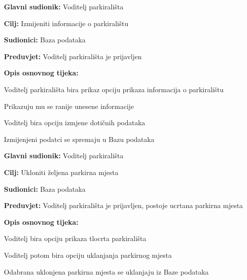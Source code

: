                         \noindent {}
					\begin{packed_item}
	
						\item \textbf{Glavni sudionik: }Voditelj parkirališta
						\item  \textbf{Cilj:} Izmijeniti informacije o parkiralištu
						\item  \textbf{Sudionici:} Baza podataka
						\item  \textbf{Preduvjet:} Voditelj parkirališta je prijavljen
						\item  \textbf{Opis osnovnog tijeka:}
						
						\item[] \begin{packed_enum}
	
							\item Voditelj parkirališta bira prikaz opciju prikaza informacija o parkiralištu
							\item Prikazuju mu se ranije unesene informacije
							\item Voditelj bira opciju izmjene dotičnih podataka 
                                \item Izmijenjeni podatci se spremaju u Bazu podataka
							
						\end{packed_enum}
					\end{packed_item}


                        \noindent {}
					\begin{packed_item}
	
						\item \textbf{Glavni sudionik: }Voditelj parkirališta
						\item  \textbf{Cilj:} Ukloniti željena parkirna mjesta
						\item  \textbf{Sudionici:} Baza podataka
						\item  \textbf{Preduvjet:} Voditelj parkirališta je prijavljen, postoje ucrtana parkirna mjesta
						\item  \textbf{Opis osnovnog tijeka:}
						
						\item[] \begin{packed_enum}
	
							\item Voditelj bira opciju prikaza tlocrta parkirališta
							\item Voditelj potom bira opciju uklanjanja parkirnog mjesta
							\item Odabrana uklonjena parkirna mjesta se uklanjaju iz Baze podataka
							
						\end{packed_enum}

        
					\end{packed_item}

